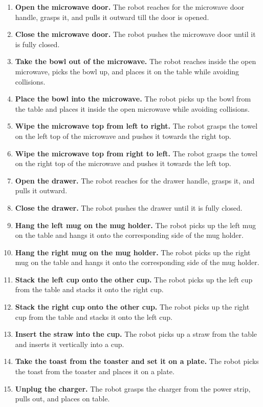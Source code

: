 \begin{enumerate}[leftmargin=1.6em,itemsep=0.1em]
    \item \textbf{Open the microwave door.} The robot reaches for the microwave door handle, grasps it, and pulls it outward till the door is opened.
    \item \textbf{Close the microwave door.} The robot pushes the microwave door until it is fully closed.
    \item \textbf{Take the bowl out of the microwave.} The robot reaches inside the open microwave, picks the bowl up, and places it on the table while avoiding collisions.
    \item \textbf{Place the bowl into the microwave.} The robot picks up the bowl from the table and places it inside the open microwave while avoiding collisions.
    \item \textbf{Wipe the microwave top from left to right.} The robot grasps the towel on the left top of the microwave and pushes it towards the right top.
    \item \textbf{Wipe the microwave top from right to left.} The robot grasps the towel on the right top of the microwave and pushes it towards the left top.
    \item \textbf{Open the drawer.} The robot reaches for the drawer handle, grasps it, and pulls it outward.
    \item \textbf{Close the drawer.} The robot pushes the drawer until it is fully closed.
    \item \textbf{Hang the left mug on the mug holder.} The robot picks up the left mug on the table and hangs it onto the corresponding side of the mug holder.
    \item \textbf{Hang the right mug on the mug holder.} The robot picks up the right mug on the table and hangs it onto the corresponding side of the mug holder.
    \item \textbf{Stack the left cup onto the other cup.} The robot picks up the left cup from the table and stacks it onto the right cup.
    \item \textbf{Stack the right cup onto the other cup.} The robot picks up the right cup from the table and stacks it onto the left cup.
    \item \textbf{Insert the straw into the cup.} The robot picks up a straw from the table and inserts it vertically into a cup.
    \item \textbf{Take the toast from the toaster and set it on a plate.} The robot picks the toast from the toaster and places it on a plate.
    \item \textbf{Unplug the charger.} The robot grasps the charger from the power strip, pulls out, and places on table.
\end{enumerate}


